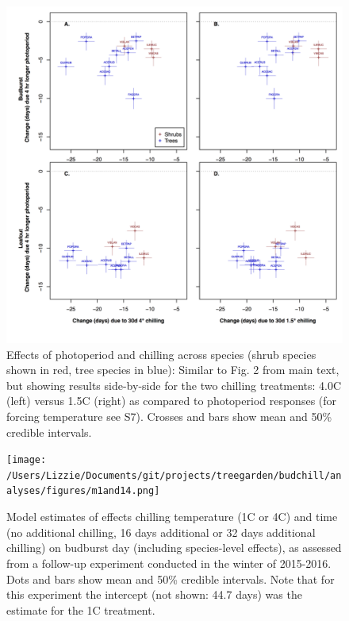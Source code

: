 \documentclass{article}
\begin{document}
\begin{figure}
\label{fig:figS7}
\includegraphics[width=1\textwidth]{FigChillPhoto_4panel.png}
\caption{Effects of photoperiod and chilling across species (shrub species shown in red, tree species in blue): Similar to Fig. 2 from main text, but showing results side-by-side for the two chilling treatments: 4.0\degree C (left) versus 1.5\degree C (right) as compared to photoperiod responses (for forcing temperature see S7). Crosses and bars show mean and 50\% credible intervals.}
\end{figure}

\begin{figure}
\texttt{[image: /Users/Lizzie/Documents/git/projects/treegarden/budchill/analyses/figures/m1and14.png]} %
\caption{Model estimates of effects chilling temperature (1\degree C or 4\degree C) and time (no additional chilling, 16 days additional or 32 days additional chilling) on budburst day (including species-level effects), as assessed from a follow-up experiment conducted in the winter of 2015-2016. Dots and bars show mean and 50\% credible intervals. Note that for this experiment the intercept (not shown: 44.7 days) was the estimate for the 1\degree C treatment.}
\label{fig:figbudchill}
\end{figure}
\end{document}
